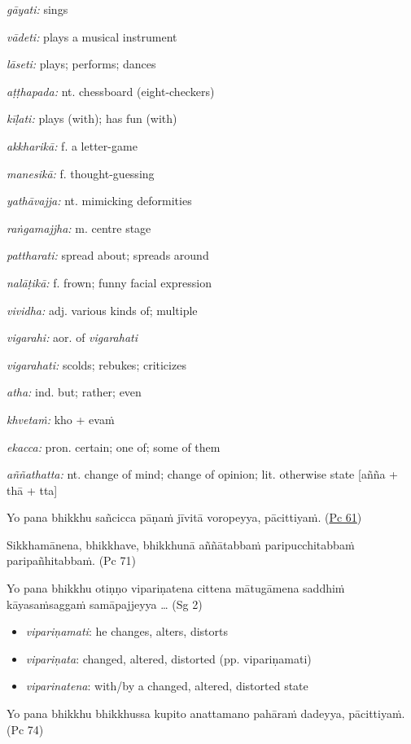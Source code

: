 \documentclass[11pt,oneside]{memoir}
\begin{document}
\begin{widecols}
\emph{gāyati:} sings

\emph{vādeti:} plays a musical instrument

\emph{lāseti:} plays; performs; dances

\emph{aṭṭhapada:} nt. chessboard (eight-checkers)

\emph{kīḷati:} plays (with); has fun (with)

\emph{akkharikā:} f. a letter-game

\emph{manesikā:} f. thought-guessing

\emph{yathāvajja:} nt. mimicking deformities

\emph{raṅgamajjha:} m. centre stage

\emph{pattharati:} spread about; spreads around

\emph{nalāṭikā:} f. frown; funny facial expression

\emph{vividha:} adj. various kinds of; multiple

\emph{vigarahi:} aor. of \emph{vigarahati}

\emph{vigarahati:} scolds; rebukes; criticizes

\emph{atha:} ind. but; rather; even

\emph{khvetaṁ:} kho + evaṁ

\emph{ekacca:} pron. certain; one of; some of them

\emph{aññathatta:} nt. change of mind; change of opinion; lit. otherwise state [añña + thā + tta]
\end{widecols}

\clearpage

Yo pana bhikkhu sañcicca pāṇaṁ jīvitā voropeyya, pācittiyaṁ. (\href{https://suttacentral.net/pli-tv-bu-vb-pc61/pli/ms}{Pc 61})

Sikkhamānena, bhikkhave, bhikkhunā aññātabbaṁ paripucchitabbaṁ paripañhitabbaṁ. (Pc 71)

Yo pana bhikkhu otiṇṇo vipariṇatena cittena mātugāmena saddhiṁ kāyasaṁsaggaṁ samāpajjeyya \ldots{} (Sg 2)

\begin{itemize}
\item \emph{vipariṇamati}: he changes, alters, distorts
\item \emph{vipariṇata}: changed, altered, distorted (pp. vipariṇamati)
\item \emph{viparinatena}: with/by a changed, altered, distorted state
\end{itemize}

Yo pana bhikkhu bhikkhussa kupito anattamano pahāraṁ dadeyya, pācittiyaṁ. (Pc 74)
\end{document}
